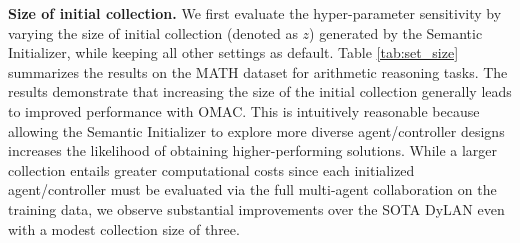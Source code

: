 


\noindent \textbf{Size of initial collection.} We first evaluate the hyper-parameter sensitivity by varying the size of initial collection (denoted as $z$) generated by the Semantic Initializer, while keeping all other settings as default. Table \ref{tab:set_size} summarizes the results on the MATH dataset for arithmetic reasoning tasks. The results demonstrate that increasing the size of the initial collection generally leads to improved performance with OMAC. This is intuitively reasonable because allowing the Semantic Initializer to explore more diverse agent/controller designs increases the likelihood of obtaining higher-performing solutions. While a larger collection entails greater computational costs since each initialized agent/controller must be evaluated via the full multi-agent collaboration on the training data, we observe substantial improvements over the SOTA DyLAN even with a modest collection size of three.





